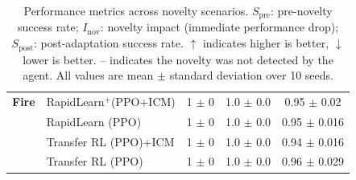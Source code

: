 \begin{table}[t]
\begin{tabular}{l l c c c}
\midrule
\textbf{Fire} & RapidLearn$^{+}$(PPO+ICM) & 1 $\pm$ 0 & 1.0 $\pm$ 0.0   & 0.95 $\pm$ 0.02 \\
              & RapidLearn (PPO)          & 1 $\pm$ 0 & 1.0 $\pm$ 0.0   & 0.95 $\pm$ 0.016 \\
              & Transfer RL (PPO)+ICM     & 1 $\pm$ 0 & 1.0 $\pm$ 0.0   & 0.94 $\pm$ 0.016 \\
              & Transfer RL (PPO)         & 1 $\pm$ 0 & 1.0 $\pm$ 0.0   & 0.96 $\pm$ 0.029 \\

\bottomrule
\end{tabular}
\caption{Performance metrics across novelty scenarios. $S_\text{pre}$: pre-novelty success rate; $I_\text{nov}$: novelty impact (immediate performance drop); $S_\text{post}$: post-adaptation success rate. $\uparrow$ indicates higher is better, $\downarrow$ lower is better. -- indicates the novelty was not detected by the agent. All values are mean $\pm$ standard deviation over 10 seeds.}
\label{tab:ng_performance}
\end{table}
